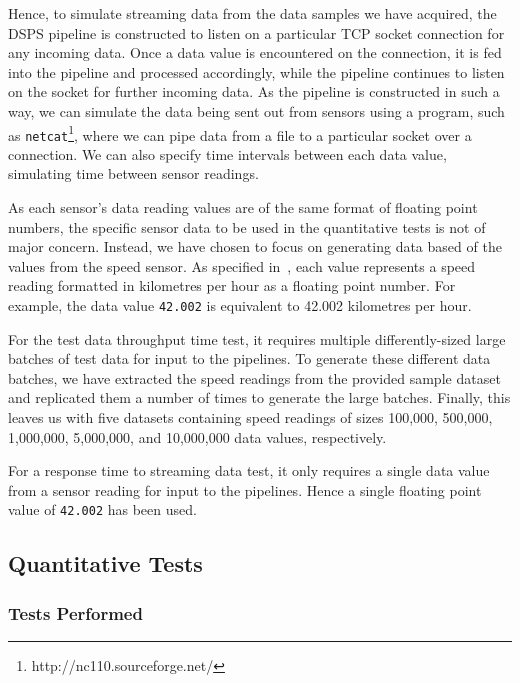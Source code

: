 Hence, to simulate streaming data from the data samples we have acquired, the DSPS pipeline is constructed to listen on
a particular TCP socket connection for any incoming data. Once a data value is encountered on the connection, it is fed into
the pipeline and processed accordingly, while the pipeline continues to listen on the socket for further incoming data.
As the pipeline is constructed in such a way, we can simulate the data being sent out from sensors using a program, such
as \texttt{netcat}\footnote{http://nc110.sourceforge.net/}, where we can pipe data from a file to a particular
socket over a connection. We can also specify time intervals between each data value, simulating time between sensor readings.

As each sensor's data reading values are of the same format of floating point numbers,
the specific sensor data to be used in the quantitative tests is not of major concern. Instead, we have chosen to focus on
generating data based of the values from the speed sensor. As specified in~, each value represents
a speed reading formatted in kilometres per hour as a floating point number. For example, the data value \texttt{42.002}
is equivalent to 42.002 kilometres per hour.

For the test data throughput time test, it requires multiple differently-sized large batches of test data for input
to the pipelines. To generate these different data batches, we have extracted the speed readings from the provided sample dataset
and replicated them a number of times to generate the large batches. Finally, this leaves us with five datasets containing
speed readings of sizes 100,\@000, 500,\@000, 1,\@000,\@000, 5,\@000,\@000, and 10,\@000,\@000 data values, respectively.

For a response time to streaming data test, it only requires a single data value from a sensor reading for input to the
pipelines. Hence a single floating point value of \texttt{42.002} has been used.



\subsection{Quantitative Tests} %
\label{sub:quantitative_tests}

\subsubsection{Tests Performed} %
\label{ssub:quan_tests_performed}

